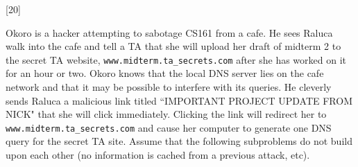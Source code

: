 \documentclass[12pt]{exam}
\newcommand{\checkbox}[3]{%
\iftoggle{pdfform}{%
\CheckBox[name = #1, backgroundcolor=white, bordercolor=black, #2]{}%
}{%
\ifprintanswers\else%
\framebox[0.6cm]{\rule{0pt}{0.4cm}#3}
\fi%
}%
}
\begin{document}
\begin{Form}
\begin{questions}


\newpage
{}[20] 

Okoro is a hacker attempting to sabotage CS161 from a cafe. He sees Raluca walk into the cafe and tell a TA that she will upload her draft of midterm 2 to the secret TA website, \texttt{www.midterm.ta\_secrets.com} after she has worked on it for an hour or two. Okoro knows that the local DNS server lies on the cafe network and that it may be possible to interfere with its queries.
He cleverly sends Raluca a malicious link titled ``IMPORTANT PROJECT UPDATE FROM NICK" that she will click immediately. Clicking the link will redirect her to \texttt{www.midterm.ta\_secrets.com} and cause her computer to generate one DNS query for the secret TA site. Assume that the following subproblems do not build upon each other (no information is cached from a previous attack, etc).

\end{questions}
\end{Form}
\end{document}
